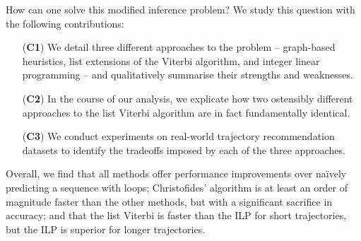 How can one solve this modified inference problem?
We study this question with the following contributions:
\begin{enumerate}
	\item[(\textbf{C1})] We detail three different approaches to the problem -- 
	graph-based heuristics,
	list extensions of the Viterbi algorithm, and integer linear programming
	-- and qualitatively summarise their strengths and weaknesses.
	\item[(\textbf{C2})] In the course of our analysis, we explicate how two ostensibly different approaches to the list Viterbi algorithm \citep{seshadri1994list,nilsson2001sequentially} are in fact fundamentally identical.
	\item[(\textbf{C3})] We conduct experiments on real-world trajectory recommendation datasets to identify the tradeoffs imposed by each of the three approaches.
\end{enumerate}
Overall, we find that
all methods offer performance improvements over na\"{i}vely predicting a sequence with loops;
Christofides' algorithm is at least an order of magnitude faster than the other methods, but with a significant sacrifice in accuracy;
and that the list Viterbi is faster than the ILP for short trajectories, but the ILP is superior for longer trajectories.


